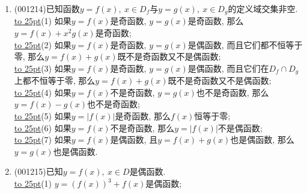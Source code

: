 \documentclass[10pt,a4paper]{article}
\newcommand{\blank}[1]{\underline{\hbox to #1pt{}}}
\begin{document}
\begin{enumerate}[1.]
\blank{25}(1) 如果$y=f(x)$是奇函数, 那么$y=|f(x)|$是偶函数;\\ 
\blank{25}(2) 如果$y=f(x)$是奇函数, 那么$y=\sqrt[3]{f(x)}$是奇函数;\\ 
\blank{25}(3) 如果$y=f(x)$是奇函数, 那么$y=f(|x|)$是奇函数;\\ 
\blank{25}(4) 如果$y=f(x)$是奇函数, 那么$y=f(|x|)$是偶函数;\\ 
\blank{25}(5) 如果$y=f(x)$是奇函数, $y=g(x)$是偶函数, 那么$y=f(x)g(x)$是奇函数;\\ 
\blank{25}(6) 如果$y=f(x)$是奇函数, $y=g(x)$不是偶函数, 那么$y=f(x)+2g(x)$既非奇函数又非偶函数;\\ 
\blank{25}(7) 如果$y=f(x)$不是奇函数, $y=g(x)$也不是奇函数, 那么$y=f(x)-g(x)$也不是奇函数;\\ 
\blank{25}(8) 如果$y=f(x)$是奇函数, $y=g(x)$不是偶函数, 那么$y=f(x)+g(x)$不是偶函数;\\ 
\blank{25}(9) 如果$y=f(x)-g(x)$是奇函数, $y=g(x)$是奇函数, 那么$y=f(x)$也是奇函数;\\ 
\blank{25}(10) 如果$y=(f(x))^2$是偶函数, 那么$y=f(x)$是偶函数或者是奇函数;\\ 
\blank{25}(11) 如果$y=(f(x))^2$是奇函数, 那么$y=f(x)$恒等于零, 因此是奇函数也是偶函数;\\ 
\blank{25}(12) 如果$y=(f(x))^3$是奇函数, 那么$y=f(x)$是奇函数.
\item {\tiny (001214)}已知函数$y=f(x),\ x \in D_f$与$y=g(x),\ x \in D_g$的定义域交集非空.\\ 
\blank{25}(1) 如果$y=f(x)$是奇函数, $y=g(x)$是奇函数, 那么$y=f(x)+x^2g(x)$是奇函数;\\ 
\blank{25}(2) 如果$y=f(x)$是奇函数, $y=g(x)$是偶函数, 而且它们都不恒等于零, 那么$y=f(x)+g(x)$既不是奇函数又不是偶函数;\\ 
\blank{25}(3) 如果$y=f(x)$是奇函数, $y=g(x)$是偶函数, 而且它们在$D_f\cap D_g$上都不恒等于零, 那么$y=f(x)+g(x)$既不是奇函数又不是偶函数;\\ 
\blank{25}(4) 如果$y=f(x)$不是奇函数, $y=g(x)$也不是奇函数, 那么$y=f(x)-g(x)$也不是奇函数;\\ 
\blank{25}(5) 如果$y=|f(x)|$是奇函数, 那么$f(x)$恒等于零;\\ 
\blank{25}(6) 如果$y=f(x)$不是奇函数, 那么$y=|f(x)|$不是偶函数;\\ 
\blank{25}(7) 如果$y=f(x)$是偶函数, 且$y=f(x)+g(x)$也是偶函数, 那么$y=g(x)$也是偶函数.
\item {\tiny (001215)}已知$y=f(x), \ x \in D$是偶函数.\\ 
\blank{25}(1) $y=(f(x))^3+f(x)$是偶函数;\\ 

\end{enumerate}
\end{document}
